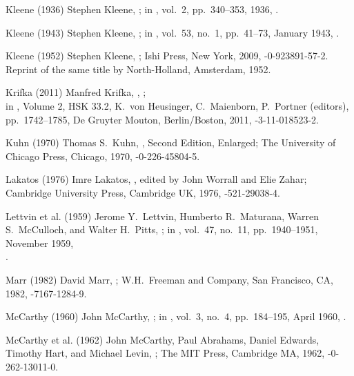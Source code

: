 \biblabel Kleene (1936)
Stephen Kleene,
;
in ,
vol.\ 2, pp.\ 340--353, 1936,
.

\biblabel Kleene (1943)
Stephen Kleene,
;
in ,
vol.\ 53, no.\ 1, pp.\ 41--73, January 1943,
.

\biblabel Kleene (1952)
Stephen Kleene,
;
Ishi Press, New York, 2009,
-0-923891-57-2.
Reprint of the same title by
North-Holland, Amsterdam, 1952.

\biblabel Krifka (2011)
Manfred Krifka,
,
;\\
in ,
 Volume 2, HSK 33.2,
 K.\ von Heusinger, C.\ Maienborn, P.\ Portner (editors),
pp.\ 1742--1785,
De Gruyter Mouton, Berlin/Boston, 2011,
-3-11-018523-2.

\biblabel Kuhn (1970)
Thomas S.\ Kuhn,
,
Second Edition, Enlarged;
The University of Chicago Press, Chicago, 1970,
-0-226-45804-5.

\biblabel Lakatos (1976)
Imre Lakatos,
,
edited by John Worrall and Elie Zahar;
Cambridge University Press, Cambridge UK, 1976,
-521-29038-4.

\biblabel Lettvin et al. (1959)
Jerome Y.\ Lettvin, Humberto R.\ Maturana,
Warren S.\ McCulloch, and Walter H.\ Pitts,
;
in ,
vol.\ 47, no.\ 11, pp.\ 1940--1951, November 1959,\\
.

\biblabel Marr (1982)
David Marr,
;
W.H.\ Freeman and Company, San Francisco, CA, 1982,
-7167-1284-9.

\biblabel McCarthy (1960)
John McCarthy,
;
in ,
vol.\ 3, no.\ 4, pp.\ 184--195, April 1960,
.

\biblabel McCarthy et al. (1962)
John McCarthy, Paul Abrahams, Daniel Edwards,
Timothy Hart, and Michael Levin,
 ;
The MIT Press, Cambridge MA, 1962,
-0-262-13011-0.

